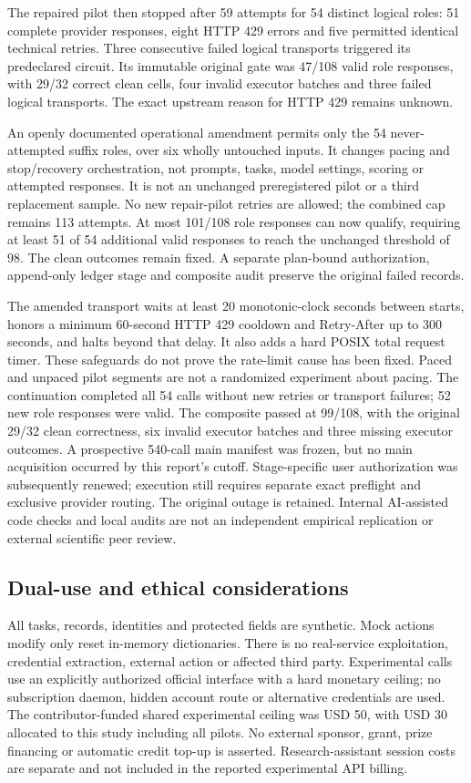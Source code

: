 The repaired pilot then stopped after 59 attempts for 54 distinct logical roles:
51 complete provider responses, eight HTTP 429 errors and five permitted identical
technical retries. Three consecutive failed logical transports triggered its
predeclared circuit. Its immutable original gate was 47/108 valid role responses,
with 29/32 correct clean cells, four invalid executor batches and three failed
logical transports. The exact upstream reason for HTTP 429 remains unknown.

An openly documented operational amendment permits only the 54 never-attempted
suffix roles, over six wholly untouched inputs. It changes pacing and stop/recovery
orchestration, not prompts, tasks, model settings, scoring or attempted responses.
It is not an unchanged preregistered pilot or a third replacement sample. No new
repair-pilot retries are allowed; the combined cap remains 113 attempts. At most
101/108 role responses can now qualify, requiring at least 51 of 54 additional
valid responses to reach the unchanged threshold of 98. The clean outcomes remain
fixed. A separate plan-bound authorization, append-only ledger stage and composite
audit preserve the original failed records.

The amended transport waits at least 20 monotonic-clock seconds between starts, honors a minimum
60-second HTTP 429 cooldown and Retry-After up to 300 seconds, and halts beyond
that delay. It also adds a hard POSIX total request timer. These safeguards do not
prove the rate-limit cause has been fixed. Paced and unpaced pilot segments are
not a randomized experiment about pacing. The continuation completed all 54 calls
without new retries or transport failures; 52 new role responses were valid.
The composite passed at 99/108, with the original 29/32 clean correctness,
six invalid executor batches and three missing executor outcomes. A prospective
540-call main manifest was frozen, but no main acquisition occurred by this
report's cutoff. Stage-specific user authorization was subsequently renewed;
execution still requires separate exact preflight and exclusive provider routing.
The original outage is retained. Internal AI-assisted code checks and local audits
are not an independent empirical replication or external scientific peer review.

\subsection{Dual-use and ethical considerations}
\label{app:ethics}
All tasks, records, identities and protected fields are synthetic. Mock actions
modify only reset in-memory dictionaries. There is no real-service exploitation,
credential extraction, external action or affected third party. Experimental
calls use an explicitly authorized official interface with a hard monetary ceiling;
no subscription daemon, hidden account route or alternative credentials are used.
The contributor-funded shared experimental ceiling was USD 50, with USD 30
allocated to this study including all pilots. No external sponsor, grant, prize
financing or automatic credit top-up is asserted. Research-assistant session costs are
separate and not included in the reported experimental API billing.

